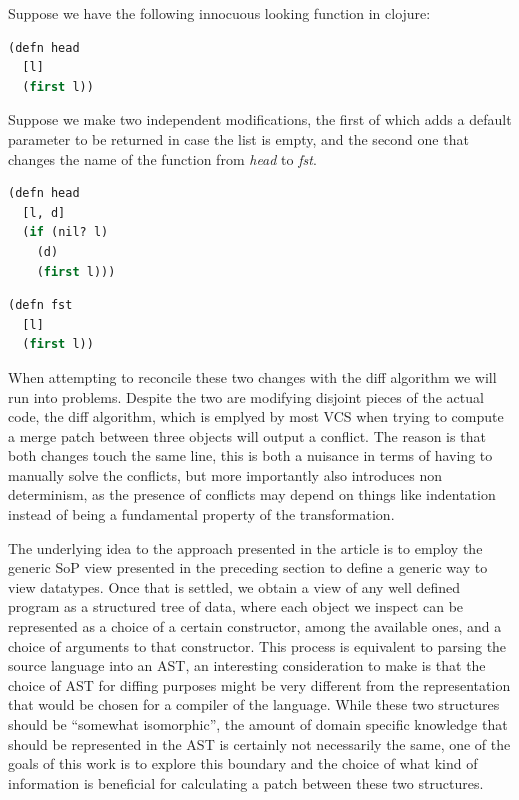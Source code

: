\documentclass[11pt]{article}
\begin{document}
Suppose we have the following innocuous looking function in clojure:

\begin{lstlisting}[language=lisp]
(defn head
  [l]
  (first l))
\end{lstlisting}

Suppose we make two independent modifications, the first of which adds a default 
parameter to be returned in case the list is empty, and the second one that 
changes the name of the function from \emph{head} to \emph{fst}.

\begin{lstlisting}[language=lisp]
(defn head
  [l, d]
  (if (nil? l)
    (d)
    (first l)))
\end{lstlisting}

\begin{lstlisting}[language=lisp]
(defn fst
  [l]
  (first l))
\end{lstlisting}

When attempting to reconcile these two changes with the diff algorithm we will run into problems.
Despite the two are modifying disjoint pieces of the 
actual code, the diff algorithm, which is emplyed by most VCS when trying to 
compute a merge patch between three objects will output a conflict. 
The reason is that both changes touch the same line, this is both a nuisance in  
terms of having to manually solve the conflicts, but more importantly also 
introduces non determinism, as the presence of conflicts may depend on 
things like indentation instead of being a fundamental property of the 
transformation. 

The underlying idea to the approach presented in the article is to employ
the generic SoP view presented in the preceding section to define a
generic way to view datatypes. Once that is settled, we obtain a view of
any well defined program as a structured tree of data, where each object
we inspect can be represented as a choice of a certain constructor,
among the available ones, and a choice of arguments to that constructor.
This process is equivalent to parsing the source language into an AST,
an interesting consideration to make is that the choice of AST for
diffing purposes might be very different from the representation that
would be chosen for a compiler of the language. While these two
structures should be ``somewhat isomorphic'', the amount of domain
specific knowledge that should be represented in the AST is certainly
not necessarily the same, one of the goals of this work is to explore
this boundary and the choice of what kind of information is beneficial
for calculating a patch between these two structures.
\end{document}
